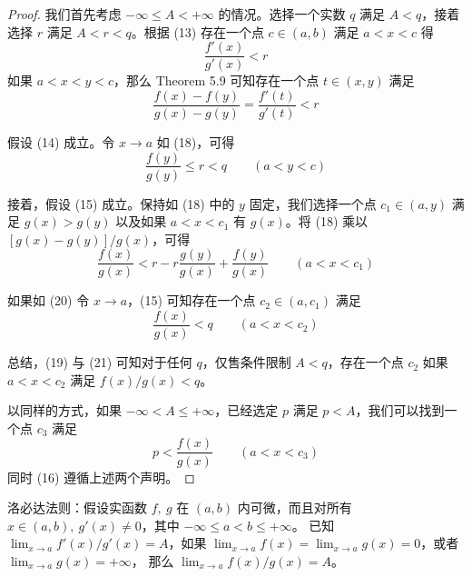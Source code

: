 \documentclass[../poma-notes.tex]{subfiles}
\begin{document}
\begin{proof}
  我们首先考虑 $-\infty \le A < +\infty$ 的情况。选择一个实数 $q$ 满足 $A < q$，接着选择 $r$ 满足 $A < r < q$。根据 (13)
  存在一个点 $c \in (a,b)$ 满足 $a < x < c$ 得
  \begin{equation}
    \frac{f'(x)}{g'(x)} < r
  \end{equation}
  如果 $a < x < y < c$，那么 Theorem 5.9 可知存在一个点 $t \in (x,y)$ 满足
  \begin{equation}
    \frac{f(x) - f(y)}{g(x) - g(y)} = \frac{f'(t)}{g'(t)} < r
  \end{equation}

  假设 (14) 成立。令 $x \to a$ 如 (18)，可得
  \begin{equation}
    \frac{f(y)}{g(y)} \le r < q \qquad (a<y<c)
  \end{equation}

  接着，假设 (15) 成立。保持如 (18) 中的 $y$ 固定，我们选择一个点 $c_1 \in (a,y)$ 满足 $g(x) > g(y)$ 以及如果 $a<x<c_1$ 有
  $g(x)$。将 (18) 乘以 $[g(x) - g(y)]/g(x)$，可得
  \begin{equation}
    \frac{f(x)}{g(x)} < r - r \frac{g(y)}{g(x)} + \frac{f(y)}{g(x)} \qquad (a<x<c_1)
  \end{equation}

  如果如 (20) 令 $x \to a$，(15) 可知存在一个点 $c_2 \in (a, c_1)$ 满足
  \begin{equation}
    \frac{f(x)}{g(x)} < q \qquad (a < x < c_2)
  \end{equation}

  总结，(19) 与 (21) 可知对于任何 $q$，仅售条件限制 $A < q$，存在一个点 $c_2$ 如果 $a < x < c_2$ 满足 $f(x)/g(x) < q$。

  以同样的方式，如果 $-\infty < A \le +\infty$，已经选定 $p$ 满足 $p < A$，我们可以找到一个点 $c_3$ 满足
  \begin{equation}
    p < \frac{f(x)}{g(x)} \qquad (a<x<c_3)
  \end{equation}
  同时 (16) 遵循上述两个声明。
\end{proof}

\begin{anote}
  洛必达法则：假设实函数 $f,\ g$ 在 $(a, b)$ 内可微，而且对所有 $x \in (a,b),\ g'(x) \ne 0$，其中 $-\infty\le a<b \le+\infty$。
  已知 $\lim_{x\to a}f'(x)/g'(x)=A$，如果 $\lim_{x\to a}f(x)=\lim_{x\to a} g(x) = 0$，或者 $\lim_{x\to a}g(x)=+\infty$，
  那么 $\lim_{x\to a} f(x)/g(x) = A$。
\end{anote}

\end{document}
